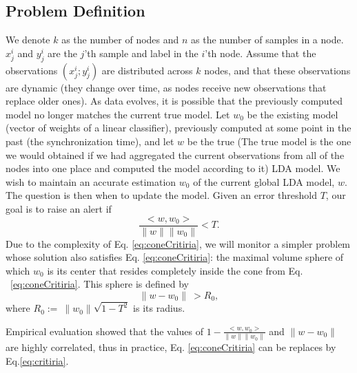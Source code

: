 \documentclass{sig-alternate-05-2015}
\begin{document}
\subsection{Problem Definition}
We denote $k$ as the number of nodes and
$n$ as the number of samples in a node.
$x^i_j$ and $y^i_j$ are the $j$'th sample and label in the $i$'th node.
Assume that the observations ${(x^i_j; y^i_j)}$ are distributed across $k$ nodes,
and that these observations are dynamic (they change over time, as nodes receive
new observations that replace older ones).
As data evolves, it is possible that the previously computed model no longer
matches the current true model.
Let $w_0$ be the existing model (vector of weights of a linear classifier),
previously computed at some point in the past (the synchronization time),
and let $w$ be the true
(The true model is the one we would obtained if we had aggregated the current observations
from all of the nodes into one place and computed the model according to it) LDA
model.
We wish to maintain an accurate estimation $w_0$ of the current global LDA model, $w$.
The question is then when to update the model.
Given an error threshold $T$, our goal is to raise an alert if
\begin{equation} \label{eq:coneCritiria}
\frac{<w,w_0>}{\parallel w \parallel \parallel w_0 \parallel}  < T.
\end{equation}
Due to the complexity of Eq. \ref{eq:coneCritiria},
we will monitor a simpler problem whose solution also satisfies
Eq. \ref{eq:coneCritiria}: the maximal volume sphere of which $w_0$ is its center
that resides completely inside the cone from Eq. ~\ref{eq:coneCritiria}.
This sphere is defined by
\begin{equation} \label{eq:critiria}
\parallel w-w_0 \parallel \  >  R_0,
\end{equation}
where $R_0 := \  \parallel w_0 \parallel \sqrt{1-T^2}$ is its radius.

Empirical evaluation showed that the values of $1-\frac{<w,w_0>}{\parallel w \parallel
\parallel w_0 \parallel}$ and $\parallel w-w_0 \parallel $ are highly  correlated, thus in practice, Eq. \ref{eq:coneCritiria} can be replaces by Eq.\ref{eq:critiria}.
\end{document}
